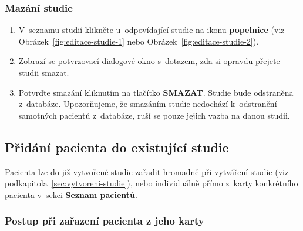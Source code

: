 \documentclass[12pt,a4paper]{article}
\begin{document}
\subsubsection{Mazání studie}

\begin{enumerate}
    \item V~seznamu studií klikněte u~odpovídající studie na ikonu \textbf{popelnice} (viz Obrázek~\ref{fig:editace-studie-1} nebo Obrázek~\ref{fig:editace-studie-2}).
    \item Zobrazí se potvrzovací dialogové okno s~dotazem, zda si opravdu přejete studii smazat.
    \item Potvrďte smazání kliknutím na tlačítko \textbf{SMAZAT}. Studie bude odstraněna z~databáze. Upozorňujeme, že smazáním studie nedochází k~odstranění samotných pacientů z~databáze, ruší se pouze jejich vazba na danou studii.
\end{enumerate}

\subsection{Přidání pacienta do existující studie}

Pacienta lze do již vytvořené studie zařadit hromadně při vytváření studie (viz podkapitola~\ref{sec:vytvoreni-studie}), nebo individuálně přímo z~karty konkrétního pacienta v~sekci \textbf{Seznam pacientů}.

\subsubsection{Postup při zařazení pacienta z jeho karty}
\end{document}
